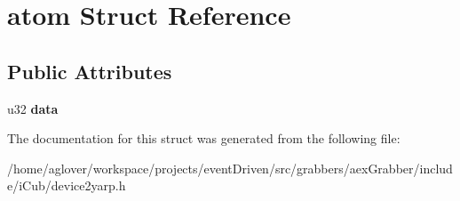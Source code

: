 \hypertarget{structatom}{\section{atom Struct Reference}
\label{structatom}
}
\subsection*{Public Attributes}
\begin{DoxyCompactItemize}
\item 
\hypertarget{structatom_a54c9c4d5af5fc3f2ca8f14f05917c197}{u32 {\bfseries data}}\label{structatom_a54c9c4d5af5fc3f2ca8f14f05917c197}

\end{DoxyCompactItemize}


The documentation for this struct was generated from the following file\-:\begin{DoxyCompactItemize}
\item 
/home/aglover/workspace/projects/event\-Driven/src/grabbers/aex\-Grabber/include/i\-Cub/device2yarp.\-h\end{DoxyCompactItemize}
